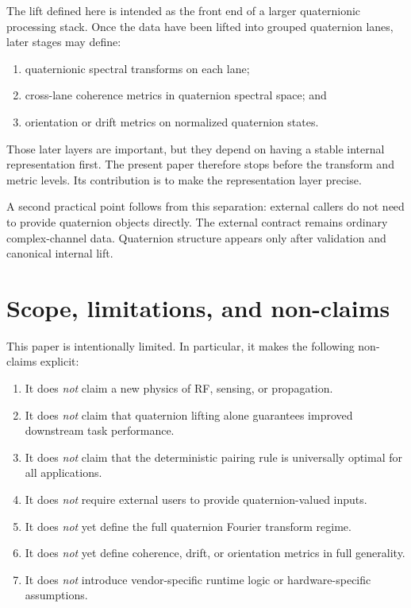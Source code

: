 \documentclass[11pt]{article}
\theoremstyle{remark}
\begin{document}
The lift defined here is intended as the front end of a larger quaternionic processing stack. Once the data have been lifted into grouped quaternion lanes, later stages may define:
\begin{enumerate}[label=(\alph*)]
    \item quaternionic spectral transforms on each lane;
    \item cross-lane coherence metrics in quaternion spectral space; and
    \item orientation or drift metrics on normalized quaternion states.
\end{enumerate}

Those later layers are important, but they depend on having a stable internal representation first. The present paper therefore stops before the transform and metric levels. Its contribution is to make the representation layer precise.

A second practical point follows from this separation: external callers do not need to provide quaternion objects directly. The external contract remains ordinary complex-channel data. Quaternion structure appears only after validation and canonical internal lift.

\section{Scope, limitations, and non-claims}

This paper is intentionally limited. In particular, it makes the following non-claims explicit:
\begin{enumerate}[label=(\arabic*)]
    \item It does \emph{not} claim a new physics of RF, sensing, or propagation.
    \item It does \emph{not} claim that quaternion lifting alone guarantees improved downstream task performance.
    \item It does \emph{not} claim that the deterministic pairing rule is universally optimal for all applications.
    \item It does \emph{not} require external users to provide quaternion-valued inputs.
    \item It does \emph{not} yet define the full quaternion Fourier transform regime.
    \item It does \emph{not} yet define coherence, drift, or orientation metrics in full generality.
    \item It does \emph{not} introduce vendor-specific runtime logic or hardware-specific assumptions.
\end{enumerate}
\end{document}
